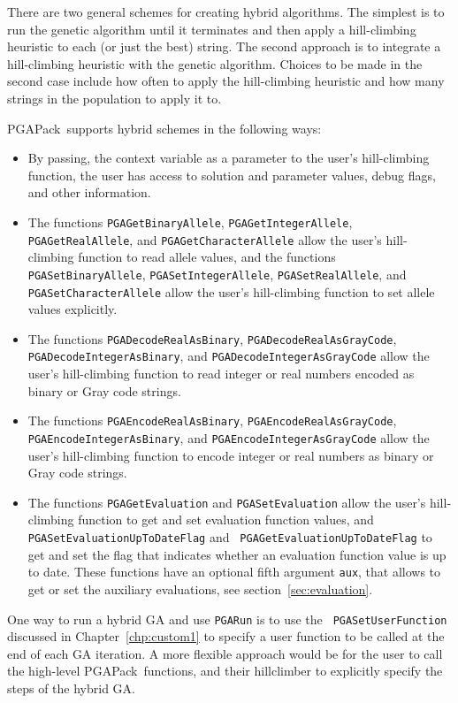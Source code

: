 \documentclass{report}
\newcommand{\pga}{PGAPack}
\begin{document}
There are two general schemes for creating hybrid algorithms.  The simplest is
to run the genetic algorithm until it terminates and then apply a
hill-climbing heuristic to each (or just the best) string.  The second
approach is to integrate a hill-climbing heuristic with the genetic algorithm.
Choices to be made in the second case include how often to apply the
hill-climbing heuristic and how many strings in the population to apply it to.


\pga\ supports hybrid schemes in the following ways:
\begin{sloppypar}
\begin{itemize}
\item By passing, the context variable as a parameter to the user's
hill-climbing function, the user has access to solution and parameter values,
debug flags, and other information.
\item The functions {\tt PGAGetBinaryAllele}, {\tt PGAGetIntegerAllele},
{\tt PGAGetRealAllele}, and {\tt PGAGetCharacterAllele} allow the user's 
hill-climbing function to read allele values, and the functions {\tt
PGASetBinaryAllele}, {\tt PGASetIntegerAllele}, {\tt PGASetRealAllele}, and
{\tt PGASetCharacterAllele} allow the user's hill-climbing function to set
allele values explicitly.
\item The functions
{\tt PGADecodeRealAsBinary}, {\tt PGADecodeRealAsGrayCode}, {\tt
PGADecodeIntegerAsBinary}, and {\tt PGADecodeIntegerAsGrayCode} allow the
user's hill-climbing function to read integer or real numbers encoded as
binary or Gray code strings.
\item The functions
{\tt PGAEncodeRealAsBinary}, {\tt PGAEncodeRealAsGrayCode}, {\tt
PGAEncodeIntegerAsBinary}, and {\tt PGAEncodeIntegerAsGrayCode} allow the
user's hill-climbing function to encode integer or real numbers as binary or
Gray code strings.
\item The functions {\tt PGAGetEvaluation} and {\tt PGASetEvaluation} allow the
user's hill-climbing function to get and set evaluation function values, and
{\tt PGASetEvaluationUpToDateFlag} and {\tt
PGAGetEvaluationUpToDateFlag} to get and set the flag that indicates
whether an evaluation function value is up to date.
These functions have an optional fifth argument \verb+aux+, that allows
to get or set the auxiliary evaluations, see section~\ref{sec:evaluation}.
\end{itemize}
\end{sloppypar}

One way to run a hybrid GA and use {\tt PGARun} is to use the {\tt
PGASetUserFunction} discussed in Chapter~\ref{chp:custom1} to specify a user
function to be called at the end of each GA iteration.  A more flexible
approach would be for the user to call the high-level \pga\ functions, and
their hillclimber to explicitly specify the steps of the hybrid GA.
\end{document}
